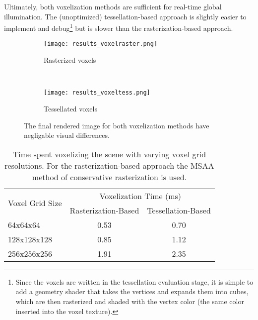 Ultimately, both voxelization methods are sufficient for real-time global illumination. The (unoptimized) tessellation-based approach is slightly easier to implement and debug\footnote{Since the voxels are written in the tessellation evaluation stage, it is simple to add a geometry shader that takes the vertices and expands them into cubes, which are then rasterized and shaded with the vertex color (the same color inserted into the voxel texture).} but is slower than the rasterization-based approach. %

\begin{figure}[h!]
\centering
    \begin{subfigure}[t]{0.4\textwidth}
        \texttt{[image: results\_voxelraster.png]}
        \caption{Rasterized voxels}
    \end{subfigure}
    ~
    \begin{subfigure}[t]{0.4\textwidth}
        \texttt{[image: results\_voxeltess.png]}
        \caption{Tessellated voxels}
    \end{subfigure}
    \caption{The final rendered image for both voxelization methods have negligable visual differences.}
    \label{fig:results_voxelization}
\end{figure}

\begin{table}[H]
\centering
\begin{tabular}{lcc}
\toprule
\multirow{2}{*}{Voxel Grid Size} & \multicolumn{2}{c}{Voxelization Time (ms)} \\
& Rasterization-Based & Tessellation-Based \\
\midrule
64x64x64        & 0.53 & 0.70\\
128x128x128     & 0.85 & 1.12\\
256x256x256     & 1.91 & 2.35\\
\bottomrule
\end{tabular}
\caption{Time spent voxelizing the scene with varying voxel grid resolutions. For the rasterization-based approach the MSAA method of conservative rasterization is used.}
\label{tbl:voxelizationtiming}
\end{table}

